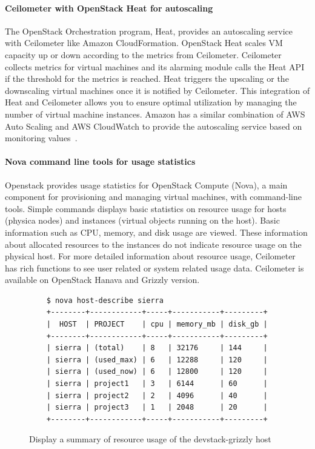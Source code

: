 \documentclass{sig-alternate-05-2015}
\begin{document}
\paragraph{Ceilometer with OpenStack Heat for autoscaling}

The OpenStack Orchestration program, Heat, provides an autoscaling service with Ceilometer like Amazon CloudFormation. OpenStack Heat scales VM capacity up or down according to the metrics from Ceilometer. Ceilometer collects metrics for virtual machines and its alarming module calls the Heat API if the threshold for the metrics is reached. Heat triggers the upscaling or the downscaling virtual machines once it is notified by Ceilometer. This integration of Heat and Ceilometer allows you to ensure optimal utilization by managing the number of virtual machine instances. Amazon has a similar combination of AWS Auto Scaling and AWS CloudWatch to provide the autoscaling service based on monitoring values~\cite{Abaakouk13}.

\paragraph{Nova command line tools for usage statistics}

Openstack provides usage statistics for OpenStack Compute (Nova), a main component for provisioning and managing virtual machines, with command-line tools. Simple commands displays basic statistics on resource usage for hosts (physica nodes) and instances (virtual objects running on the host). Basic information such as CPU, memory, and disk usage are viewed. These information about allocated resources to the instances do not indicate resource usage on the physical host. For more detailed information about resource usage, Ceilometer has rich functions to see user related or system related usage data. Ceilometer is available on OpenStack Hanava and Grizzly version. 

\begin{figure}[htb]
\begin{scriptsize}
\begin{verbatim}
    $ nova host-describe sierra
    +--------+------------+-----+-----------+---------+
    |  HOST  | PROJECT    | cpu | memory_mb | disk_gb |
    +--------+------------+-----+-----------+---------+
    | sierra | (total)    | 8   | 32176     | 144     |
    | sierra | (used_max) | 6   | 12288     | 120     |
    | sierra | (used_now) | 6   | 12800     | 120     |
    | sierra | project1   | 3   | 6144      | 60      |
    | sierra | project2   | 2   | 4096      | 40      |
    | sierra | project3   | 1   | 2048      | 20      |
    +--------+------------+-----+-----------+---------+
\end{verbatim}
\vspace{-20pt}
\end{scriptsize}

\caption{Display a summary of resource usage of the devstack-grizzly host}
\label{F:host-describe}

\end{figure}
\end{document}
